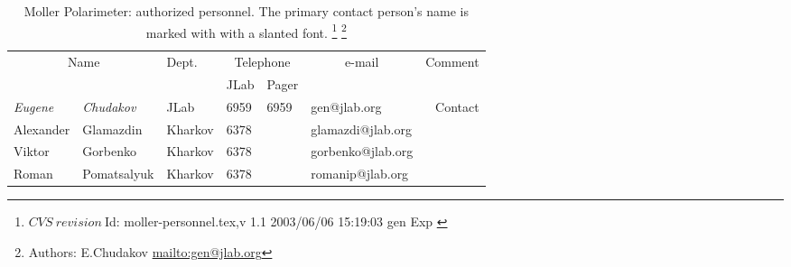 \begin{table}[ht]
\begin{center}
\begin{tabular}{|ll|l|l|l|l|r|} \hline
  \multicolumn{2}{|c|}{Name} & Dept. & \multicolumn{2}{c|}{Telephone} & 
  \multicolumn{1}{c|}{e-mail} & Comment \\ 
  \cline{4-5}
   &  &   & JLab & Pager &  & \\ 
\hline
%
 {\em Eugene} & {\em Chudakov}  & JLab    & 6959 & 6959 & gen@jlab.org      & Contact     \\ 
 Alexander    & Glamazdin       & Kharkov & 6378 &      & glamazdi@jlab.org &  \\ 
 Viktor       & Gorbenko        & Kharkov & 6378 &      & gorbenko@jlab.org &  \\ 
 Roman        & Pomatsalyuk     & Kharkov & 6378 &      & romanip@jlab.org  &  \\ 
\hline
\end{tabular}
\end{center}
\caption{Moller Polarimeter: authorized personnel. The primary contact person's
 name is marked with with a slanted font.
\footnote{
  $CVS~revision~ $Id: moller-personnel.tex,v 1.1 2003/06/06 15:19:03 gen Exp $ $
}
\footnote{Authors: E.Chudakov \url{mailto:gen@jlab.org}} 
}
\label{tab:moller:personnel}
\end{table}
%
%
%
